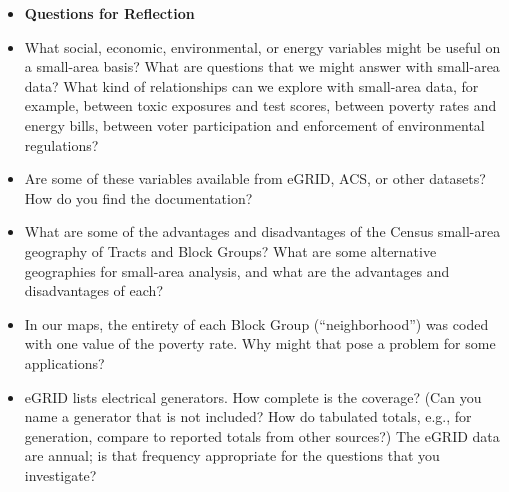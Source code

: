 \documentclass[fleqn, 12pt]{exam}
\begin{document}
    \begin{itemize}
  \item \textbf{Questions for Reflection}
  \item What social, economic, environmental, or energy variables might be useful on a small-area basis? What are questions that we might answer with small-area data? What kind of relationships can we explore with small-area data, for example, between toxic exposures and test scores, between poverty rates and energy bills, between voter participation and enforcement of environmental regulations?
  \item Are some of these variables available from eGRID, ACS, or other datasets? How do you find the documentation?
  \item What are some of the advantages and disadvantages of the Census small-area geography of Tracts and Block Groups? What are some alternative geographies for small-area analysis, and what are the advantages and disadvantages of each?
  \item In our maps, the entirety of each Block Group (``neighborhood'') was coded with one value of the poverty rate. Why might that pose a problem for some applications?
  \item eGRID lists electrical generators.  How complete is the coverage? (Can you name a generator that is not included? How do tabulated totals, e.g., for generation, compare to reported totals from other sources?)  The eGRID data are annual; is that frequency appropriate for the questions that you investigate?
  \end{itemize}
  
\end{document}
